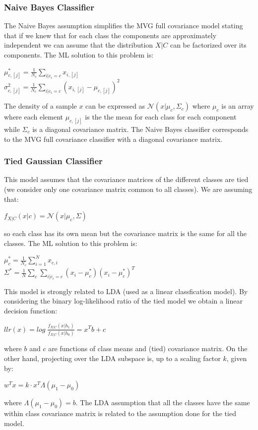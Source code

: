 \documentclass[10pt, a4paper, twocolumn]{article} %
\begin{document}
\subsubsection{Naive Bayes Classifier}
The Naive Bayes assumption simplifies the MVG full covariance model stating that if we knew
that for each class the components are approximately independent we can assume that the 
distribution $X|C$ can be factorized over its components. The ML solution to this problem is:
\begin{center}
	$\mu_{c,[j]}^* = \frac{1}{N_c}\sum_{i|c_i=c}^{}x_{i,[j]}$ \\
	$\sigma_{c,[j]}^2 = \frac{1}{N_c}\sum_{i|c_i=c}^{}(x_{i,[j]}-\mu_{c,[j]})^2$
\end{center}
The density of a sample $x$ can be expressed as $\mathcal{N}(x|\mu_c,\Sigma_c)$ where
$\mu_c$ is an array where each element $\mu_{c,[j]}$ is the the mean for each class
for each component while $\Sigma_c$ is a diagonal covariance matrix. The Naive Bayes classifier
corresponds to the MVG full covariance classifier with a diagonal covariance matrix.
\subsubsection{Tied Gaussian Classifier}
This model assumes that the covariance matrices of the different classes are tied (we consider
only one covariance matrix common to all classes). We are assuming that:
\begin{center}
	$f_{X|C}(x|c) = \mathcal{N} (x|\mu_c, \Sigma)$
\end{center}
so each class has its own mean but the covariance matrix is the same for all the classes. The ML
solution to this problem is:
\begin{center}
	$\mu_{c}^* = \frac{1}{N_c}\sum_{i=1}^{N}x_{c,i}$ \\
	$\Sigma^* = \frac{1}{N}\sum_c{}^{}\sum_{i|c_i=c}^{}(x_{i}-\mu_c^*)(x_{i}-\mu_c^*)^T$
\end{center}
This model is strongly related to LDA (used as a linear classfication model). By considering 
the binary log-likelihood ratio of the tied model we obtain a linear decision function:
\begin{center}
	$llr(x) = log\;\frac{f_{X|C}(x|h_1)}{f_{X|C}(x|h_0)} = x^Tb + c$ 
\end{center}
where $b$ and $c$ are functions of class means and (tied) covariance matrix. On the other hand,
projecting over the LDA subspace is, up to a scaling factor $k$, given by:
\begin{center}
	$w^Tx = k \cdot x^T\varLambda (\mu_1-\mu_0)$ 
\end{center}
where $\varLambda (\mu_1-\mu_0) = b$. The LDA assumption that all the classes have the same
within class covariance matrix is related to the assumption done for the tied model.\\
\end{document}
